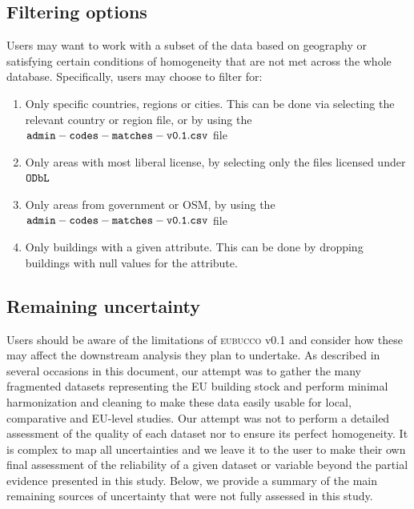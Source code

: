 \documentclass[fleqn,10pt]{wlscirep}
\begin{document}
\subsection*{Filtering options}
Users may want to work with a subset of the data based on geography or satisfying certain conditions of homogeneity that are not met across the whole database. Specifically, users may choose to filter for:
\begin{enumerate}[topsep=0.2pt]
    \itemsep-0.15em 
    \item Only specific countries, regions or cities. This can be done via selecting the relevant country or region file, or by using the ${\tt admin-codes-matches-v0.1.csv}$ file
    \item Only areas with most liberal license, by selecting only the files licensed under ${\tt ODbL}$   
    \item Only areas from government or OSM, by using the ${\tt admin-codes-matches-v0.1.csv}$ file
    \item Only buildings with a given attribute. This can be done by dropping buildings with null values for the attribute.
\end{enumerate}


\subsection*{Remaining uncertainty}
Users should be aware of the limitations of \textsc{eubucco} v0.1 and consider how these may affect the downstream analysis they plan to undertake. As described in several occasions in this document, our attempt was to gather the many fragmented datasets representing the EU building stock and perform minimal harmonization and cleaning to make these data easily usable for local, comparative and EU-level studies. Our attempt was not to perform a detailed assessment of the quality of each dataset nor to ensure its perfect homogeneity.
It is complex to map all uncertainties and we leave it to the user to make their own final assessment of the reliability of a given dataset or variable beyond the partial evidence presented in this study.
Below, we provide a summary of the main remaining sources of uncertainty that were not fully assessed in this study.  
\end{document}
